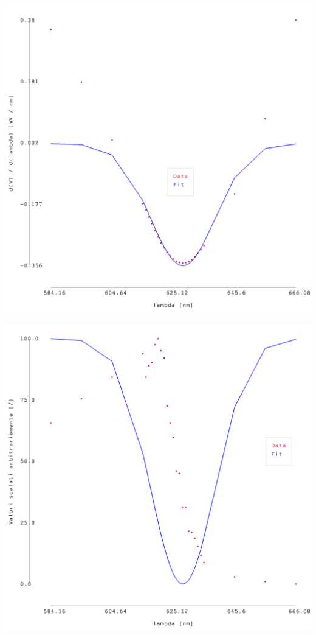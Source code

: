 \documentclass{article}
\begin{document}
\begin{center}
    \begin{minipage}{0.25\textwidth}        
        \includegraphics[width=1\linewidth]{../images/grafico1_3.png}
    \end{minipage}
    \hfill
    \begin{minipage}{0.25\textwidth}        
        \includegraphics[width=1\linewidth]{../images/grafico3_3.png}

\end{minipage}
\end{center}
\end{document}

